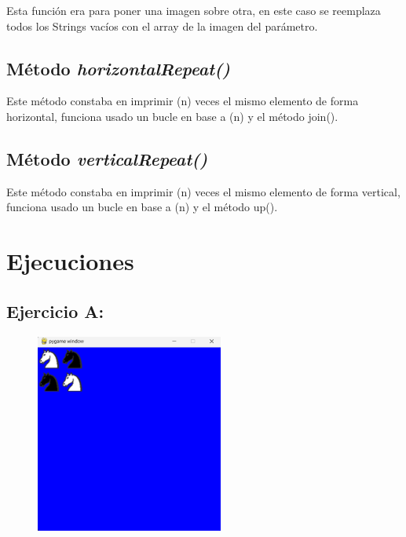 \documentclass{article}
\begin{document}
Esta función era para poner una imagen sobre otra, en este caso se reemplaza todos los Strings vacíos con el array de la imagen del parámetro.
	
		
		
	\subsection{Método \textit{horizontalRepeat()}}

Este método constaba en imprimir (n) veces el mismo elemento de forma horizontal, funciona usado un bucle en base a (n) y el método join().
	
		
		
	\subsection{Método \textit{verticalRepeat()}}

Este método constaba en imprimir (n) veces el mismo elemento de forma vertical, funciona usado un bucle en base a (n) y el método up().

		
		
	\clearpage
	
	\section{Ejecuciones}
	
	\subsection{Ejercicio A:}
	
	\begin{figure}[H]
		\centering
		\includegraphics[width=0.55\textwidth,keepaspectratio]{img/Picture A.png}
	\end{figure}	
	
\end{document}
